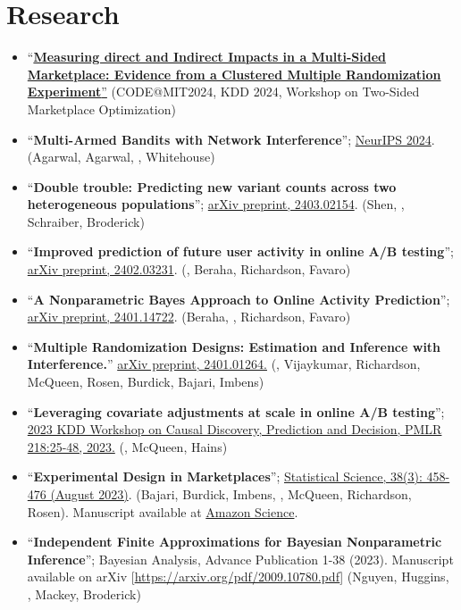 \documentclass[10pt, a4paper]{article}
\newcommand{\years}[1]{\marginnote{\scriptsize #1}}
\begin{document}
\section*{Research}
\begin{itemize}
	\item ``\href{https://drive.google.com/file/d/1auP6JpB0DxIQRCIDazum5uFlm9BtTkiS/view?usp=sharing}{{\textbf{Measuring direct and Indirect Impacts in a Multi-Sided Marketplace: Evidence from a Clustered Multiple Randomization Experiment}}''} (CODE@MIT2024, KDD 2024, Workshop on Two-Sided Marketplace Optimization)
	\item ``\textbf{Multi-Armed Bandits with Network Interference}''; \href{https://arxiv.org/abs/2405.18621}{NeurIPS 2024}. (Agarwal, Agarwal, \mm, Whitehouse)
	\item ``\textbf{Double trouble: Predicting new variant counts across two heterogeneous populations}''; \href{https://arxiv.org/pdf/2403.02154.pdf}{arXiv preprint, 2403.02154}. (Shen, \mm, Schraiber, Broderick)
	\item ``\textbf{Improved prediction of future user activity in online A/B testing}''; \href{https://arxiv.org/abs/2402.03231}{arXiv preprint, 2402.03231}. (\mm, Beraha, Richardson, Favaro)
	\item ``\textbf{A Nonparametric Bayes Approach to Online Activity Prediction}''; \href{https://arxiv.org/abs/2401.14722}{arXiv preprint, 2401.14722}. (Beraha, \mm, Richardson, Favaro)
	\item ``\textbf{Multiple Randomization Designs: Estimation and Inference with Interference.}'' \href{https://arxiv.org/abs/2401.01264}{arXiv preprint, 2401.01264.} (\mm, Vijaykumar, Richardson, McQueen, Rosen, Burdick, Bajari, Imbens) 
	\item ``\textbf{Leveraging covariate adjustments at scale in online A/B testing}''; \href{https://proceedings.mlr.press/v218/masoero23a.html}{2023 KDD Workshop on Causal Discovery, Prediction and Decision, PMLR 218:25-48, 2023.} (\mm, McQueen, Hains)
	\item ``\textbf{Experimental Design in Marketplaces}''; \href{https://projecteuclid.org/journals/statistical-science/advance-publication/Experimental-Design-in-Marketplaces/10.1214/23-STS883.short}{Statistical Science, 38(3): 458-476 (August 2023)}. (Bajari, Burdick, Imbens, \mm, McQueen, Richardson, Rosen). Manuscript available at \href{https://www.amazon.science/publications/experimental-design-in-marketplaces}{Amazon Science}.
	\item ``\textbf{Independent Finite Approximations for Bayesian Nonparametric Inference}''; Bayesian Analysis, Advance Publication 1-38 (2023). Manuscript available on arXiv [\url{https://arxiv.org/pdf/2009.10780.pdf}] (Nguyen, Huggins, \mm, Mackey, Broderick)

\end{itemize}
\end{document}

